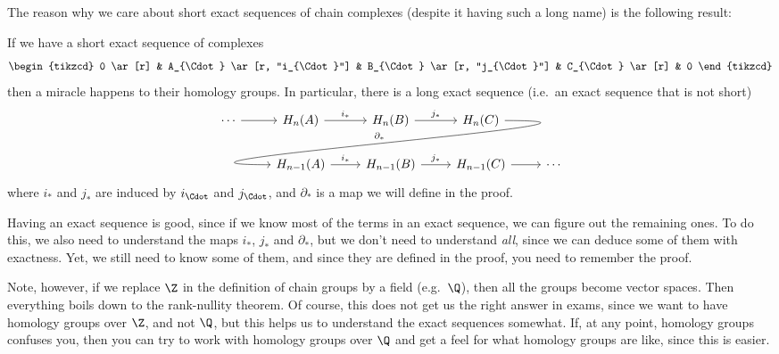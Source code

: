 \documentclass[a4paper]{article}
\begin{document}
The reason why we care about short exact sequences of chain complexes (despite it having such a long name) is the following result:
\begin{thm}
  If we have a short exact sequence of complexes
  \[
    \begin{tikzcd}
      0 \ar[r] & A_{\Cdot} \ar [r, "i_{\Cdot}"] & B_{\Cdot} \ar [r, "j_{\Cdot}"] & C_{\Cdot} \ar[r] & 0
    \end{tikzcd}
  \]
  then a miracle happens to their homology groups. In particular, there is a long exact sequence (i.e.\ an exact sequence that is not short)
  \[
    \begin{tikzcd}
      \cdots \ar [r] & H_n(A) \ar[r, "i_*"] & H_n(B) \ar[r, "j_*"] & H_n(C) \ar[out=0, in=180, looseness=2, overlay, dll, "\partial_*"']\\
      & H_{n - 1}(A) \ar[r, "i_*"] & H_{n - 1}(B) \ar[r, "j_*"] & H_{n - 1}(C) \ar [r] & \cdots
    \end{tikzcd}
  \]
  where $i_*$ and $j_*$ are induced by $i_{\Cdot}$ and $j_{\Cdot}$, and $\partial_*$ is a map we will define in the proof.
\end{thm}
Having an exact sequence is good, since if we know most of the terms in an exact sequence, we can figure out the remaining ones. To do this, we also need to understand the maps $i_*$, $j_*$ and $\partial_*$, but we don't need to understand \emph{all}, since we can deduce some of them with exactness. Yet, we still need to know some of them, and since they are defined in the proof, you need to remember the proof.

Note, however, if we replace $\Z$ in the definition of chain groups by a field (e.g.\ $\Q$), then all the groups become vector spaces. Then everything boils down to the rank-nullity theorem. Of course, this does not get us the right answer in exams, since we want to have homology groups over $\Z$, and not $\Q$, but this helps us to understand the exact sequences somewhat. If, at any point, homology groups confuses you, then you can try to work with homology groups over $\Q$ and get a feel for what homology groups are like, since this is easier.
\end{document}
